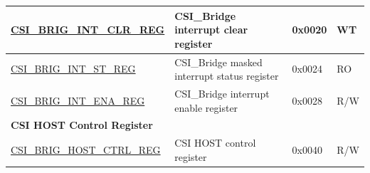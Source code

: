 \begin{longtable}{ | p{6cm} | p{7.2cm} | p{1.3cm} | p{1cm} | }
\hyperref[regdesc:CSIBRIGINTCLRREG]{CSI\_BRIG\_INT\_CLR\_REG} & CSI\_Bridge interrupt clear register & 0x0020 & WT \\ \hline
\hyperref[regdesc:CSIBRIGINTSTREG]{CSI\_BRIG\_INT\_ST\_REG} & CSI\_Bridge masked interrupt status register & 0x0024 & RO \\ \hline
\hyperref[regdesc:CSIBRIGINTENAREG]{CSI\_BRIG\_INT\_ENA\_REG} & CSI\_Bridge interrupt enable register & 0x0028 & R/W \\ \hline
\multicolumn{4}{|l|}{\textbf{CSI HOST Control Register}} \\ \hline
\hyperref[regdesc:CSIBRIGHOSTCTRLREG]{CSI\_BRIG\_HOST\_CTRL\_REG} & CSI HOST control register & 0x0040 & R/W \\ \hline
\end{longtable}
